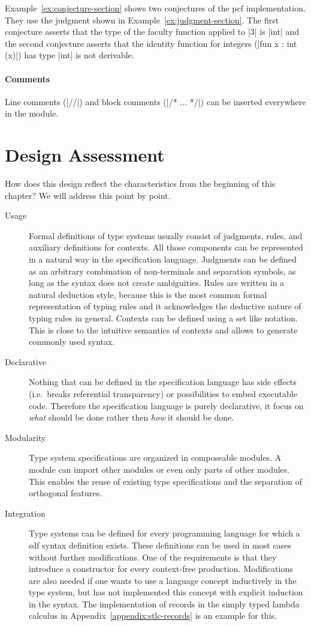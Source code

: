 Example~\ref{ex:conjecture-section} shows two conjectures of the
\gls{pcf} implementation. They use the judgment shown in
Example~\ref{ex:judgment-section}. The first conjecture asserts that
the type of the faculty function applied to \code|3| is \code|int| and
the second conjecture asserts that the identity function for integers
(\code|fun x : int (x)|) has type \code|int| is not derivable.

\paragraph{Comments} Line comments (\code|//|) and block comments
(\code|/* ... */|) can be inserted everywhere in the module.

\section{Design Assessment}
How does this design reflect the characteristics from the beginning of
this chapter? We will address this point by point.

\begin{description}
\item[Usage] Formal definitions of type systems usually consist of
  judgments, rules, and auxiliary definitions for contexts. All those
  components can be represented in a natural way in the specification
  language. Judgments can be defined as an arbitrary combination of
  non-terminals and separation symbols, as long as the syntax does not
  create ambiguities. Rules are written in a natural deduction style,
  because this is the most common formal representation of typing
  rules and it acknowledges the deductive nature of typing rules in
  general. Contexts can be defined using a set like notation. This is
  close to the intuitive semantics of contexts and allows to generate
  commonly used syntax.
\item[Declarative] Nothing that can be defined in the specification
  language has side effects (i.e.\ breaks referential transparency) or
  possibilities to embed executable code. Therefore the specification
  language is purely declarative, it focus on \emph{what} should be
  done rather then \emph{how} it should be done.
\item[Modularity] Type system specifications are organized in
  composeable modules. A module can import other modules or even only
  parts of other modules. This enables the reuse of existing type
  specifications and the separation of orthogonal features.
\item[Integration] Type systems can be defined for every programming
  language for which a \gls{sdf} syntax definition exists. These
  definitions can be used in most cases without further
  modifications. One of the requirements is that they introduce a
  constructor for every context-free production. Modifications are
  also needed if one wants to use a language concept inductively in
  the type system, but has not implemented this concept with explicit
  induction in the syntax. The implementation of records in the simply
  typed lambda calculus in Appendix~\ref{appendix:stlc-records} is an
  example for this.
\end{description}
